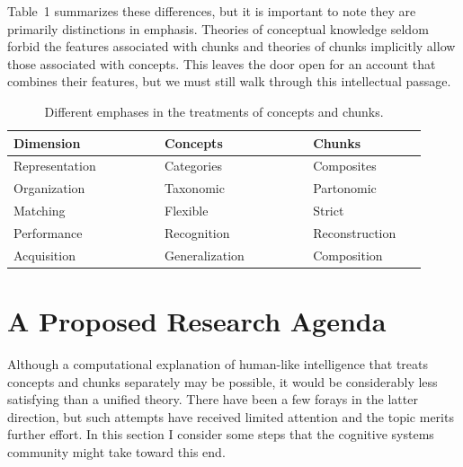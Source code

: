 \documentclass[11pt,letterpaper]{article}
\begin{document}
\vskip 0.05in
\noindent
Table~1 summarizes these differences, but it is important to note 
they are primarily distinctions in emphasis. Theories of conceptual
knowledge seldom forbid the features associated with chunks and
theories of chunks implicitly allow those associated with concepts.
This leaves the door open for an account that combines their features,
but we must still walk through this intellectual passage. 

\begin{table}[t]
\vskip -0.15in
\begin{center}
\caption{Different emphases in the treatments of concepts and chunks.}
\vskip 0.15in
\begin{tabular}{lllll}
\hline
\abovespace\belowspace
\quad Dimension      & ~~~~~~ & Concepts     & ~~~~~~ & Chunks \\
\hline
\abovespace
\quad Representation &        & Categories   &        & Composites \\
\quad Organization   &        & Taxonomic    &        & Partonomic \\
\quad Matching       &        & Flexible     &        & Strict \\
\quad Performance    &        & Recognition  &        & Reconstruction~~~ \\
\belowspace
\quad Acquisition    &        & Generalization &      & Composition \\
\hline
\end{tabular}
\end{center}
\end{table}

\section{A Proposed Research Agenda} 


Although a computational explanation of human-like intelligence that 
treats concepts and chunks separately may be possible, it would be
considerably less satisfying than a unified theory. There have 
been a few forays in the latter direction, but such attempts have 
received limited attention and the topic merits further effort. In
this section I consider some steps that the cognitive systems community
might take toward this end.

\end{document}
